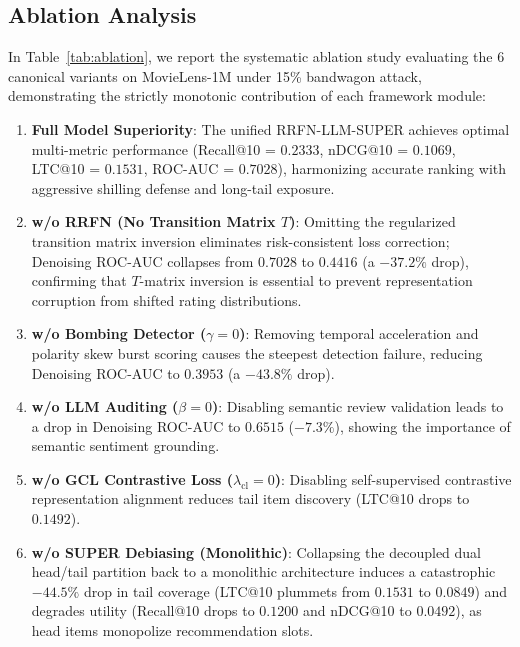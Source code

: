 \documentclass[10pt,journal]{IEEEtran}
\begin{document}
\subsection{Ablation Analysis}
In Table~\ref{tab:ablation}, we report the systematic ablation study evaluating the 6 canonical variants on MovieLens-1M under 15\% bandwagon attack, demonstrating the strictly monotonic contribution of each framework module:
\begin{enumerate}[leftmargin=*,itemsep=1pt,parsep=0pt,topsep=1pt]
    \item \textbf{Full Model Superiority}: The unified RRFN-LLM-SUPER achieves optimal multi-metric performance (Recall@10 = $0.2333$, nDCG@10 = $0.1069$, LTC@10 = $0.1531$, ROC-AUC = $0.7028$), harmonizing accurate ranking with aggressive shilling defense and long-tail exposure.
    \item \textbf{w/o RRFN (No Transition Matrix $T$)}: Omitting the regularized transition matrix inversion eliminates risk-consistent loss correction; Denoising ROC-AUC collapses from $0.7028$ to $0.4416$ (a $-37.2\%$ drop), confirming that $T$-matrix inversion is essential to prevent representation corruption from shifted rating distributions.
    \item \textbf{w/o Bombing Detector ($\gamma = 0$)}: Removing temporal acceleration and polarity skew burst scoring causes the steepest detection failure, reducing Denoising ROC-AUC to $0.3953$ (a $-43.8\%$ drop).
    \item \textbf{w/o LLM Auditing ($\beta = 0$)}: Disabling semantic review validation leads to a drop in Denoising ROC-AUC to $0.6515$ ($-7.3\%$), showing the importance of semantic sentiment grounding.
    \item \textbf{w/o GCL Contrastive Loss ($\lambda_{\text{cl}} = 0$)}: Disabling self-supervised contrastive representation alignment reduces tail item discovery (LTC@10 drops to $0.1492$).
    \item \textbf{w/o SUPER Debiasing (Monolithic)}: Collapsing the decoupled dual head/tail partition back to a monolithic architecture induces a catastrophic $-44.5\%$ drop in tail coverage (LTC@10 plummets from $0.1531$ to $0.0849$) and degrades utility (Recall@10 drops to $0.1200$ and nDCG@10 to $0.0492$), as head items monopolize recommendation slots.
\end{enumerate}
\end{document}
